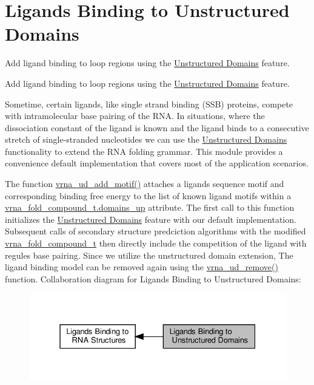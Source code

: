 \hypertarget{group__ligands__up}{}\section{Ligands Binding to Unstructured Domains}
\label{group__ligands__up}


Add ligand binding to loop regions using the \hyperlink{group__domains__up}{Unstructured Domains} feature.  


Add ligand binding to loop regions using the \hyperlink{group__domains__up}{Unstructured Domains} feature. 

Sometime, certain ligands, like single strand binding (S\+SB) proteins, compete with intramolecular base pairing of the R\+NA. In situations, where the dissociation constant of the ligand is known and the ligand binds to a consecutive stretch of single-\/stranded nucleotides we can use the \hyperlink{group__domains__up}{Unstructured Domains} functionality to extend the R\+NA folding grammar. This module provides a convenience default implementation that covers most of the application scenarios.

The function \hyperlink{group__domains__up_ga55f7de5ef5b7472b0eeab9296b57f671}{vrna\+\_\+ud\+\_\+add\+\_\+motif()} attaches a ligands sequence motif and corresponding binding free energy to the list of known ligand motifs within a \hyperlink{group__fold__compound_a4f70b6d32681fc8ca061236f21819ae7}{vrna\+\_\+fold\+\_\+compound\+\_\+t.\+domains\+\_\+up} attribute. The first call to this function initializes the \hyperlink{group__domains__up}{Unstructured Domains} feature with our default implementation. Subsequent calls of secondary structure predciction algorithms with the modified \hyperlink{group__fold__compound_ga1b0cef17fd40466cef5968eaeeff6166}{vrna\+\_\+fold\+\_\+compound\+\_\+t} then directly include the competition of the ligand with regules base pairing. Since we utilize the unstructured domain extension, The ligand binding model can be removed again using the \hyperlink{group__domains__up_gada59cb0c498b812eadd010811af3f2d4}{vrna\+\_\+ud\+\_\+remove()} function. Collaboration diagram for Ligands Binding to Unstructured Domains\+:
\nopagebreak
\begin{figure}[H]
\begin{center}
\leavevmode
\includegraphics[width=331pt]{group__ligands__up}
\end{center}
\end{figure}
